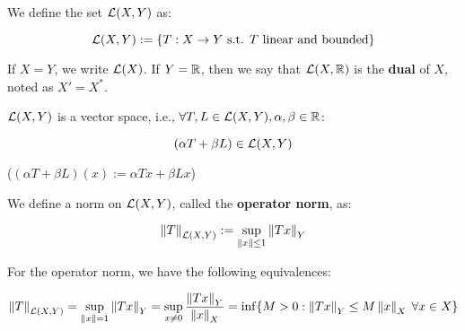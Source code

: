\begin{fdefinition}
    We define the set $\mathcal{L}(X, Y)$ as:

    $$\mathcal{L}(X, Y) := \{T: X \to Y \text{ s.t. } T \text { linear and bounded}\}$$

    If $X = Y$, we write $\mathcal{L}(X)$. If $Y = \mathbb{R}$, then we say that $\mathcal{L}(X, \mathbb{R})$ is the 
    \textbf{dual} of $X$, noted as $X' = X^*$.
\end{fdefinition}

\begin{fremark}
    $\mathcal{L}(X, Y)$ is a vector space, i.e., 
    $\forall T,L \in \mathcal{L}(X, Y), \alpha, \beta \in \mathbb{R}$:

    $$(\alpha T + \beta L) \in \mathcal{L}(X, Y)$$

    ($(\alpha T + \beta L)(x):= \alpha T x + \beta L x$)

\end{fremark}

\vspace{1em}

\begin{fdefinition}
    We define a norm on $\mathcal{L}(X, Y)$, called the \textbf{operator norm}, as:

    $$\left\|T\right\|_{\mathcal{L}(X, Y)} := \sup_{\left\|x\right\|\leq1} \left\|Tx\right\|_Y$$
\end{fdefinition}

\begin{fproposition}
    For the operator norm, we have the following equivalences:

    $$\left\|T\right\|_{\mathcal{L}(X, Y)} = \sup_{\left\|x\right\|=1} \left\|Tx\right\|_Y = 
    \sup_{x \neq 0} \frac{\left\|Tx\right\|_Y}{\left\|x\right\|_X} = 
    \inf \{M > 0: \left\|Tx\right\|_Y \leq M \left\|x\right\|_X \; \forall x \in X\}$$
\end{fproposition}

